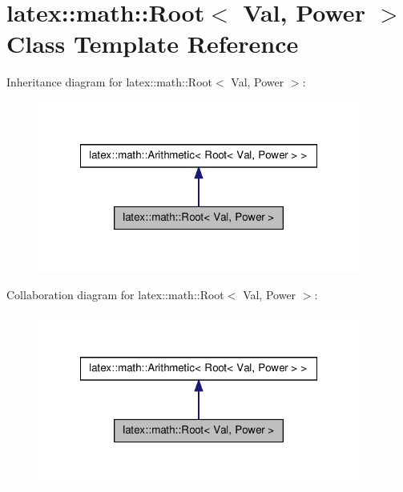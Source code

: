 \hypertarget{classlatex_1_1math_1_1Root}{\section{latex\-:\-:math\-:\-:\-Root$<$ \-Val, \-Power $>$ \-Class \-Template \-Reference}
\label{classlatex_1_1math_1_1Root}
}


\-Inheritance diagram for latex\-:\-:math\-:\-:\-Root$<$ \-Val, \-Power $>$\-:
\nopagebreak
\begin{figure}[H]
\begin{center}
\leavevmode
\includegraphics[width=300pt]{classlatex_1_1math_1_1Root__inherit__graph}
\end{center}
\end{figure}


\-Collaboration diagram for latex\-:\-:math\-:\-:\-Root$<$ \-Val, \-Power $>$\-:
\nopagebreak
\begin{figure}[H]
\begin{center}
\leavevmode
\includegraphics[width=300pt]{classlatex_1_1math_1_1Root__coll__graph}
\end{center}
\end{figure}
